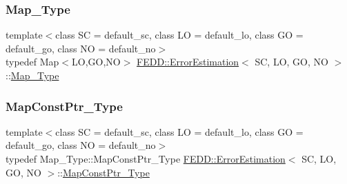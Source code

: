 \mbox{\label{classFEDD_1_1ErrorEstimation_a94d0ce98d9e797cc35769bda8d3ef9fc}} 
\subsubsection{\texorpdfstring{Map\+\_\+\+Type}{Map\_Type}}
{\footnotesize\ttfamily template$<$class SC  = default\+\_\+sc, class LO  = default\+\_\+lo, class GO  = default\+\_\+go, class NO  = default\+\_\+no$>$ \\
typedef Map$<$LO,GO,NO$>$ \hyperlink{classFEDD_1_1ErrorEstimation}{F\+E\+D\+D\+::\+Error\+Estimation}$<$ SC, LO, GO, NO $>$\+::\hyperlink{classFEDD_1_1ErrorEstimation_a94d0ce98d9e797cc35769bda8d3ef9fc}{Map\+\_\+\+Type}}

\mbox{\label{classFEDD_1_1ErrorEstimation_ad45c898ab6123b9e7d5efbc0e5365ccf}} 
\subsubsection{\texorpdfstring{Map\+Const\+Ptr\+\_\+\+Type}{MapConstPtr\_Type}}
{\footnotesize\ttfamily template$<$class SC  = default\+\_\+sc, class LO  = default\+\_\+lo, class GO  = default\+\_\+go, class NO  = default\+\_\+no$>$ \\
typedef Map\+\_\+\+Type\+::\+Map\+Const\+Ptr\+\_\+\+Type \hyperlink{classFEDD_1_1ErrorEstimation}{F\+E\+D\+D\+::\+Error\+Estimation}$<$ SC, LO, GO, NO $>$\+::\hyperlink{classFEDD_1_1ErrorEstimation_ad45c898ab6123b9e7d5efbc0e5365ccf}{Map\+Const\+Ptr\+\_\+\+Type}}

\mbox{\label{classFEDD_1_1ErrorEstimation_aaa2f9c22726907f5403cdeb0261b67fd}} 
